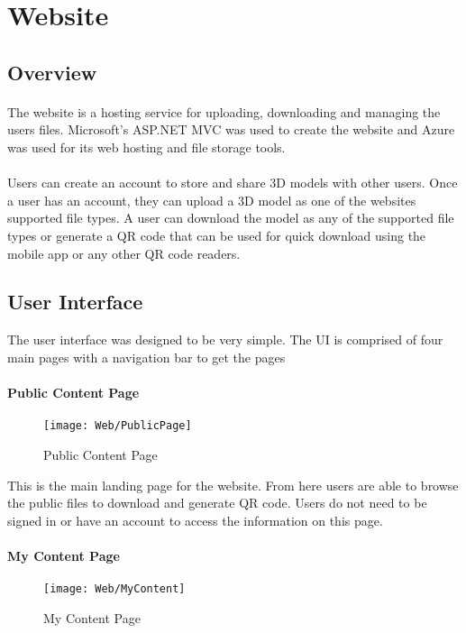 
 \section{Website}

 \subsection{Overview}
 \paragraph{}
 The website is a hosting service for uploading, downloading and managing the users files. Microsoft's ASP.NET MVC was used to create the website and Azure was used for its web hosting and file storage tools.
 
 \paragraph{}
 Users can create an account to store and share 3D models with other users. Once a user has an account, they can upload a 3D model as one of the websites supported file types. A user can download the model as any of the supported file types or generate a QR code that can be used for quick download using the mobile app or any other QR code readers.

\subsection{User Interface}
The user interface was designed to be very simple. The UI is comprised of four main pages with a navigation bar to get the pages
    \paragraph{Public Content Page}

        \begin{figure}[H]
        \texttt{[image: Web/PublicPage]}
        \centering
        \caption{Public Content Page}
        \label{fig:PublicContent}
        \end{figure}

        This is the main landing page for the website. From here users are able to browse the public files to download and generate QR code. Users do not need to be signed in or have an account to access the information on this page.

    \paragraph{My Content Page}
        \begin{figure}[H]
        \texttt{[image: Web/MyContent]}
        \centering
        \caption{My Content Page}
        \label{fig:MyContent}
        \end{figure}

